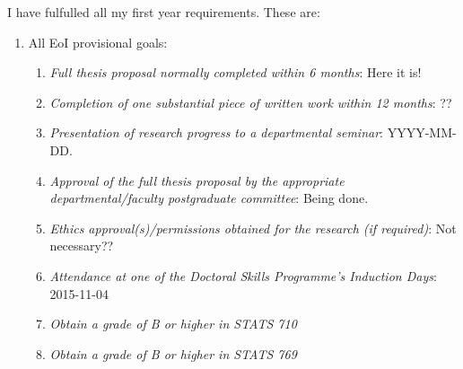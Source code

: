 \documentclass[12pt,a4paper]{article}
\begin{document}
I have fulfulled all my first year requirements.
These are:
\begin{enumerate}

\item
All EoI provisional goals:
\begin{enumerate}

\item
\textit{Full thesis proposal normally completed within 6 months}:
Here it is!

\item
\textit{Completion of one substantial piece of written work within
12 months}: ??


\item
\textit{Presentation of research progress to a departmental seminar}:
YYYY-MM-DD.

\item
\textit{Approval of the full thesis proposal by the appropriate
departmental/faculty postgraduate committee}:
Being done.

\item
\textit{Ethics approval(s)/permissions obtained for the research
(if required)}:
Not necessary??

\item
\textit{Attendance at one of the Doctoral Skills Programme's
Induction Days}:
2015-11-04

\item
\textit{Obtain a grade of B or higher in STATS 710}

\item
\textit{Obtain a grade of B or higher in STATS 769}

\end{enumerate}














\end{enumerate}
\end{document}
